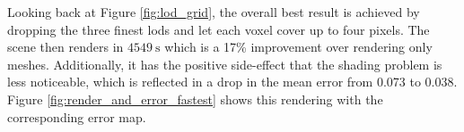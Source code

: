 Looking back at Figure \ref{fig:lod_grid}, the overall best result is achieved by dropping the three finest \acsp{lod} and let each voxel cover up to four pixels.
The scene then renders in $\SI{4549}{\s}$ which is a 17\% improvement over rendering only meshes.
Additionally, it has the positive side-effect that the shading problem is less noticeable, which is reflected in a drop in the mean \FLIP error from 0.073 to 0.038.
Figure \ref{fig:render_and_error_fastest} shows this rendering with the corresponding \FLIP error map.
\begin{figure}[t]
    \centering
    \begin{subfigure}[b]{\linewidth}
\end{subfigure}
\end{figure}
